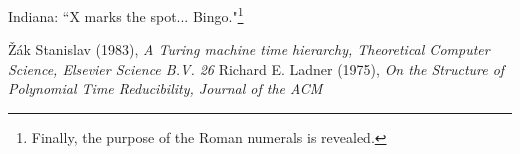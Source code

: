 \documentclass{article}
\begin{document}
Indiana: ``X marks the spot... Bingo."\footnote{Finally, the purpose of the Roman numerals is revealed.}

\begin{thebibliography}{2}
Žák Stanislav (1983), \textit{A Turing machine time hierarchy, Theoretical Computer Science, Elsevier Science B.V. 26}
Richard E. Ladner (1975), \textit{On the Structure of Polynomial Time Reducibility, Journal of the ACM}
\end{thebibliography}

\vfill\eject
\end{document}

